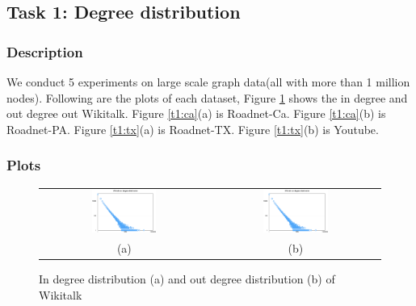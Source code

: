 \subsection{Task 1: Degree distribution}

\subsubsection{Description}
We conduct 5 experiments on large scale graph data(all with more than 1 million nodes). Following are the plots of each dataset, Figure \ref{t1:wiki} shows the in degree and out degree out Wikitalk. Figure \ref{t1:ca}(a) is Roadnet-Ca. Figure \ref{t1:ca}(b) is Roadnet-PA. Figure \ref{t1:tx}(a) is Roadnet-TX. Figure \ref{t1:tx}(b) is Youtube. 

\subsubsection{Plots}

\begin{figure}[hf]
\begin{center}
\begin{tabular}{cc}
     \includegraphics[width=0.4\textwidth]{FIG/t1_wiki_in.png} &
     \includegraphics[width=0.4\textwidth]{FIG/t1_wiki_out.png} \\
    (a) & (b) 
\end{tabular}
\caption{In degree distribution (a) and out degree distribution (b) of Wikitalk}
\label{t1:wiki}
\end{center}
\end{figure}

